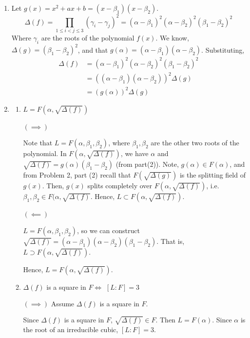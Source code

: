 \documentclass[12pt]{article}
\begin{document}
\begin{solution}
\begin{enumerate}
       
       \item Let $g(x) = x^2 + ax + b = (x-\beta_1)(x-\beta_2)$. 
        \[\Delta(f) = \prod_{1 \leq i < j \leq 3}(\gamma_i - \gamma_j)^2 = (\alpha - \beta_1)^2(\alpha-\beta_2)^2(\beta_1-\beta_2)^2\]
       Where $\gamma_i$ are the roots of the polynomial $f(x)$. 
       We know, $\Delta(g) = (\beta_1-\beta_2)^2$, and that $g(\alpha) = (\alpha - \beta_1)(\alpha - \beta_2)$. Substituting, 
       \begin{align*}
        \Delta(f) &= (\alpha - \beta_1)^2(\alpha-\beta_2)^2(\beta_1-\beta_2)^2 \\ 
        &= ((\alpha - \beta_1)(\alpha-\beta_2))^2\Delta(g) \\ 
        &= (g(\alpha))^2\Delta(g)
       \end{align*}
        
       \item \begin{enumerate}
        \item $ L = F(\alpha, \sqrt{\Delta(f)})$ 
        
        $(\implies)$

        Note that $L = F(\alpha, \beta_1, \beta_2)$, where $\beta_1, \beta_2$ are the other two roots of the polynomial. In $F(\alpha, \sqrt{\Delta(f)})$, we have $\alpha$ and $\sqrt{\Delta(f)} = g(\alpha)(\beta_1 - \beta_2)$ (from part(2)). Note, $g(\alpha) \in F(\alpha)$, and from Problem 2, part (2) recall that $F(\sqrt{\Delta(g)})$ is the splitting field of $g(x)$. Then, $g(x)$ splits completely over $F(\alpha, \sqrt{\Delta(f)})$, i.e. $\beta_1, \beta_2 \in F(\alpha, \sqrt{\Delta(f)}$. Hence, $L \subset F(\alpha, \sqrt{\Delta(f)})$. 


        $(\impliedby)$

        $L = F(\alpha, \beta_1, \beta_2)$, so we can construct $\sqrt{\Delta(f)} = (\alpha - \beta_1)(\alpha-\beta_2)(\beta_1 - \beta_2)$. That is, $L \supset F(\alpha, \sqrt{\Delta(f)})$. 

        Hence, $L = F(\alpha, \sqrt{\Delta(f)})$. 

        \bbni

        \item $\Delta(f)$ is a square in $F \iff$ $[L:F] = 3$
        
        $(\implies)$ Assume $\Delta(f)$ is a square in $F$. 

        Since $\Delta(f)$ is a square in $F$, $\sqrt{\Delta(f)} \in F$. Then $L = F(\alpha)$. Since $\alpha$ is the root of an irreducible cubic, $[L:F] = 3$.  


\end{enumerate}
\end{enumerate}
\end{solution}
\end{document}
